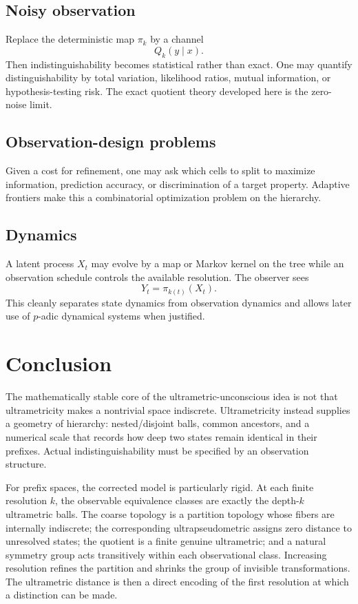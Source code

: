 \documentclass[11pt]{article}
\theoremstyle{definition}
\theoremstyle{remark}
\begin{document}
\subsection{Noisy observation}
Replace the deterministic map $\pi_k$ by a channel
\[
Q_k(y\mid x).
\]
Then indistinguishability becomes statistical rather than exact.  One may quantify distinguishability by total variation, likelihood ratios, mutual information, or hypothesis-testing risk.  The exact quotient theory developed here is the zero-noise limit.

\subsection{Observation-design problems}
Given a cost for refinement, one may ask which cells to split to maximize information, prediction accuracy, or discrimination of a target property.  Adaptive frontiers make this a combinatorial optimization problem on the hierarchy.

\subsection{Dynamics}
A latent process $X_t$ may evolve by a map or Markov kernel on the tree while an observation schedule controls the available resolution.  The observer sees
\[
Y_t=\pi_{k(t)}(X_t).
\]
This cleanly separates state dynamics from observation dynamics and allows later use of $p$-adic dynamical systems when justified.

\section{Conclusion}

The mathematically stable core of the ultrametric-unconscious idea is not that ultrametricity makes a nontrivial space indiscrete.  Ultrametricity instead supplies a geometry of hierarchy: nested/disjoint balls, common ancestors, and a numerical scale that records how deep two states remain identical in their prefixes.  Actual indistinguishability must be specified by an observation structure.

For prefix spaces, the corrected model is particularly rigid.  At each finite resolution $k$, the observable equivalence classes are exactly the depth-$k$ ultrametric balls.  The coarse topology is a partition topology whose fibers are internally indiscrete; the corresponding ultrapseudometric assigns zero distance to unresolved states; the quotient is a finite genuine ultrametric; and a natural symmetry group acts transitively within each observational class.  Increasing resolution refines the partition and shrinks the group of invisible transformations.  The ultrametric distance is then a direct encoding of the first resolution at which a distinction can be made.
\end{document}
